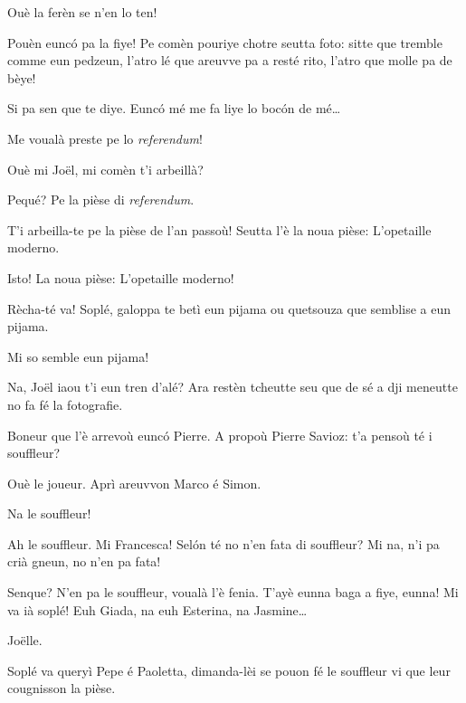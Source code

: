 \begin{drama}
\Francescaspeaks Ouè la ferèn se n'en lo ten!

 \Joellespeaks Pouèn euncó pa la fiye! Pe comèn pouriye chotre seutta foto: sitte  que tremble comme eun pe\-dzeun, l’atro lé  que areuvve pa a resté rito, l'atro que molle pa de bèye!
 
 \Francescaspeaks Si pa sen que te diye. Euncó mé me fa liye lo boc\'on de mé\ldots
 

\Joelspeaks{} Me voualà preste pe lo \textit{referendum}!

\Joellespeaks Ouè mi Jo\"{e}l, mi comèn t'i arbeillà?

\Joelspeaks Pequé? Pe la pièse di \textit{referendum}.

\Joellespeaks T'i arbeilla-te pe la pièse de l'an passoù! Seutta l'è la noua pièse: \og L’opetaille moderno\fg.

\Joelspeaks Isto! La noua pièse: \og L'opetaille moderno\fg!

\Joellespeaks Rècha-té va! Soplé, galoppa te betì eun pijama ou que\-tsouza que semblise a eun pijama.

\Joelspeaks Mi so semble eun pijama!


\Francescaspeaks{} Na, Jo\"{e}l iaou t'i eun tren d'alé? Ara restèn tcheutte seu que de sé a dji meneutte no fa fé la fotografie. 


\Francescaspeaks Boneur que l'è arrevoù euncó Pierre.  A propoù Pierre Savioz: t'a pensoù té i souffleur?

\Pierrespeaks Ouè le joueur. Aprì areuvvon Marco é Simon.

\Francescaspeaks Na le souffleur!
 
\Pierrespeaks Ah le souffleur. Mi Francesca! Sel\'on té no n'en fata di souffleur? Mi na, n'i pa crià gneun, no n'en pa fata!
 
\Cimaspeaks Senque? N'en pa le souffleur, voualà l'è fenia. T'ayè eunna baga a fiye, eunna!  Mi va ià soplé!  Euh Giada, na euh Esterina, na Jasmine\ldots

\Joellespeaks Jo\"{e}lle.

\Cimaspeaks Soplé va queryì Pepe é Paoletta, dimanda-lèi se pouon fé le souffleur vi que leur cougnisson la pièse.


\end{drama}
